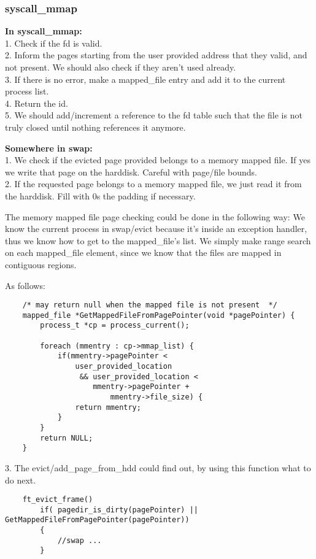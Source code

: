 \subsubsection{ syscall\_mmap }
\textbf{In syscall\_mmap:}
	\\1. Check if the fd is valid.
	\\2. Inform the pages starting from the user provided address that they valid, and not present. We should also check if they aren't used already.
	\\3. If there is no error, make a mapped\_file entry and add it to the current process list.
	\\4. Return the id.
	\\5. We should add/increment a reference to the fd table such that the file is not truly closed until nothing references it anymore.



	\textbf{Somewhere in swap:}
	\\1. We check if the evicted page provided belongs to a memory mapped file. If yes we write that page on the harddisk. Careful with page/file bounds.
	\\2. If the requested page belongs to a memory mapped file, we just read it from the harddisk. Fill with 0s the padding if necessary.

The memory mapped file page checking could be done in the following way: We know the current process in swap/evict because it's inside an exception handler, thus we know how to get to the mapped\_file's list. We simply make range search on each mapped\_file element, since we know that the files are mapped in contiguous regions.

As follows:
\begin{lstlisting}	
	/* may return null when the mapped file is not present  */
	mapped_file *GetMappedFileFromPagePointer(void *pagePointer) {
		process_t *cp = process_current();
		
		foreach (mmentry : cp->mmap_list) {
			if(mmentry->pagePointer < 
				user_provided_location 
				 && user_provided_location < 
					mmentry->pagePointer + 
						mmentry->file_size) {
				return mmentry;
			}
		}
		return NULL;
	}
\end{lstlisting}
	3. The evict/add\_page\_from\_hdd could find out, by using this function what to do next.
\begin{lstlisting}
	ft_evict_frame()
		if( pagedir_is_dirty(pagePointer) || GetMappedFileFromPagePointer(pagePointer))
		{
			//swap ...
		}
\end{lstlisting}

